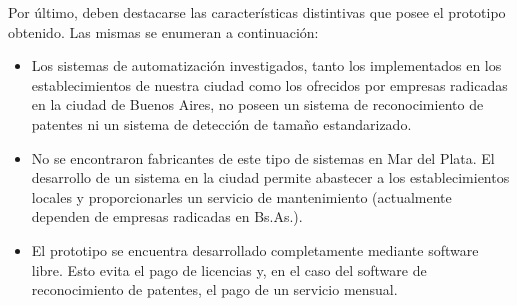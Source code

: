 Por último, deben destacarse las características distintivas que posee el prototipo obtenido. Las mismas se enumeran a continuación:

\begin{itemize}
	\item Los sistemas de automatización investigados, tanto los implementados en los establecimientos de nuestra ciudad como los ofrecidos por empresas radicadas en la ciudad de Buenos Aires, no poseen un sistema de reconocimiento de patentes ni un sistema de detección de tamaño estandarizado.
	\item No se encontraron fabricantes de este tipo de sistemas en Mar del Plata. El desarrollo de un sistema en la ciudad permite abastecer a los establecimientos locales y proporcionarles un servicio de mantenimiento (actualmente dependen de empresas radicadas en Bs.As.).
	\item El prototipo se encuentra desarrollado completamente mediante software libre. Esto evita el pago de licencias y, en el caso del software de reconocimiento de patentes, el pago de un servicio mensual.
\end{itemize}





